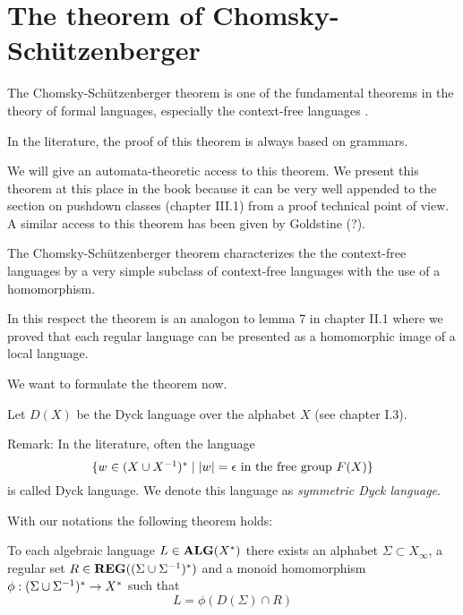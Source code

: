 \section{The theorem of Chomsky-Schützenberger}

The Chomsky-Schützenberger theorem is one of the fundamental theorems in the
theory of formal languages, especially the context-free languages \cite{ChSch}.

In the literature, the proof of this theorem is always based on grammars.

We will give an automata-theoretic access to this theorem. We present this
theorem at this place in the book because it can be very well appended to the
section on pushdown classes (chapter III.1) from a proof technical point of
view. A similar access to this theorem has been given by Goldstine
\cite{Goldstine77} (?).

The Chomsky-Schützenberger theorem characterizes the the context-free languages
by a very simple subclass of context-free languages with the use of a
homomorphism.

In this respect the theorem is an analogon to lemma 7 in chapter II.1 where we
proved that each regular language can be presented as a homomorphic image of a
local language.

We want to formulate the theorem now.

Let $D(X)$ be the Dyck language over the alphabet $X$ (see chapter I.3).

Remark: In the literature, often the language
\[ \mbox{$\{w\in (X \cup {X}^{-1})^* \mid |w|= \epsilon\text{ in the free group
}F(X)\}$} 
\] 
is called Dyck language. We denote this language as {\em symmetric Dyck
language}.

With our notations the following theorem holds:
\begin{theorem}
To each algebraic language $L\in \mbox{{\bf ALG}}(X^*)$ there exists an alphabet $\Sigma
\subset X_\infty$, a regular set $R\in \mbox{{\bf REG}}((\Sigma \cup {\Sigma}^{-1})^*)$ and a monoid
homomorphism $\phi: (\Sigma \cup {\Sigma}^{-1})^* \to X^*$ such that
\[ L = \phi(D(\Sigma)\cap R) \]
\end{theorem}

